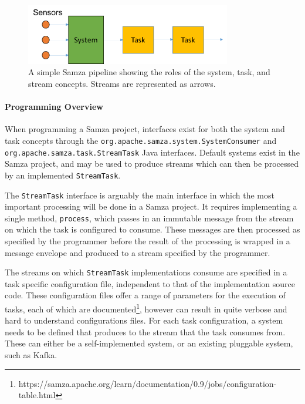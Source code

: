 \begin{figure}[h]
  \centering
  \includegraphics[width=0.8\textwidth]{includes/figures/fig_samza_overview}
  \caption{A simple Samza pipeline showing the roles of the system, task, and stream concepts. Streams are represented
  as arrows.}
  \label{fig:samza_overview}
\end{figure}

\paragraph{Programming Overview}

When programming a Samza project, interfaces exist for both the system and task concepts through the \texttt{org.apache.samza.system.SystemConsumer}
and \texttt{org.apache.samza.task.StreamTask} Java interfaces. Default systems exist in the Samza project, and may be
used to produce streams which can then be processed by an implemented \texttt{StreamTask}.

The \texttt{StreamTask} interface is arguably the main interface in which the most important processing will be done in
a Samza project. It requires implementing a single method, \texttt{process}, which passes in an immutable message from the stream
on which the task is configured to consume. These messages are then processed as specified by the programmer before the
result of the processing is wrapped in a message envelope and produced to a stream specified by the programmer.

The streams on which \texttt{StreamTask} implementations consume are specified in a task specific configuration file,
independent to that of the implementation source code. These configuration files offer a range of parameters for the
execution of tasks, each of which are documented\footnote{https://samza.apache.org/learn/documentation/0.9/jobs/configuration-table.html},
however can result in quite verbose and hard to understand configurations files. For each task configuration, a system
needs to be defined that produces to the stream that the task consumes from. These can either be a self-implemented
system, or an existing pluggable system, such as Kafka.


